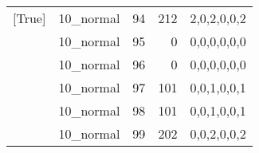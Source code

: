 \begin{tabular}{llrrl}
 [True]          & 10\_normal           &            94 &                   212 & 2,0,2,0,0,2   \\
 [True]          & 10\_normal           &            95 &                     0 & 0,0,0,0,0,0   \\
 [True]          & 10\_normal           &            96 &                     0 & 0,0,0,0,0,0   \\
 [True]          & 10\_normal           &            97 &                   101 & 0,0,1,0,0,1   \\
 [True]          & 10\_normal           &            98 &                   101 & 0,0,1,0,0,1   \\
 [True]          & 10\_normal           &            99 &                   202 & 0,0,2,0,0,2   \\
\hline
\end{tabular}
